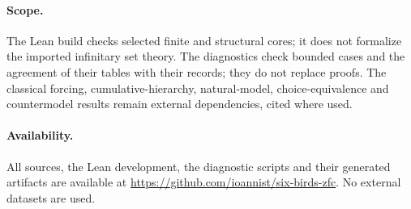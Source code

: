 \paragraph{Scope.} The Lean build checks selected finite and structural cores; it does not formalize
the imported infinitary set theory. The diagnostics check bounded cases and the agreement of their
tables with their records; they do not replace proofs. The classical forcing, cumulative-hierarchy,
natural-model, choice-equivalence and countermodel results remain external dependencies, cited
where used.

\paragraph{Availability.} All sources, the Lean development, the diagnostic scripts and their
generated artifacts are available at \url{https://github.com/ioannist/six-birds-zfc}. No external
datasets are used.
